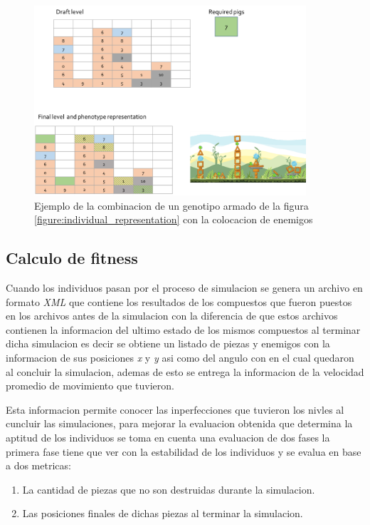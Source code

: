 \begin{figure}
  \centering
  \includegraphics[width=0.9\textwidth]{img/layer123_combine.png}
  \caption{Ejemplo de la combinacion de un genotipo armado de la figura \ref{figure:individual_representation} con la colocacion de enemigos}
  \label{figure:ind_representation_plus_pigs}
\end{figure}

\subsection{Calculo de fitness}
\label{subsection:fitness_calculation}

Cuando los individuos pasan por el proceso de simulacion se genera un archivo en
formato \textit{XML} que contiene los resultados de los compuestos que fueron
puestos en los archivos antes de la simulacion con la diferencia de que estos
archivos contienen la informacion del ultimo estado de los mismos compuestos al
terminar dicha simulacion es decir se obtiene un listado de piezas y enemigos con
la informacion de sus posiciones \textit{x} y \textit{y} asi como del angulo con
en el cual quedaron al concluir la simulacion, ademas de esto se entrega la
informacion de la velocidad promedio de movimiento que tuvieron.

Esta informacion permite conocer las inperfecciones que tuvieron los nivles al
cuncluir las simulaciones, para mejorar la evaluacion obtenida que determina la
aptitud de los individuos se toma en cuenta una evaluacion de dos fases la
primera fase tiene que ver con la estabilidad de los individuos y se evalua en
base a dos metricas:
\begin{enumerate}
    \item La cantidad de piezas que no son destruidas durante la simulacion.
    \item Las posiciones finales de dichas piezas al terminar la simulacion.
\end{enumerate}

